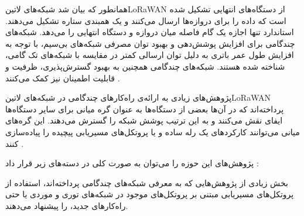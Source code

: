 
همانطور که بیان شد شبکه‌های ‌لاتین{LoRaWAN} از دستگاه‌های انتهایی تشکیل شده است که داده را برای دروازه‌ها ارسال می‌کنند و یک همبندی ستاره تشکیل می‌دهند.
استاندارد تنها اجازه یک گام فاصله میان دروازه و دستگاه انتهایی را می‌دهد.
شبکه‌های چندگامی برای افزایش پوشش‌دهی و بهبود توان مصرفی شبکه‌های بی‌سیم،
با توجه به افزایش طول عمر باتری به دلیل توان ارسالی کمتر در مقایسه با شبکه‌های تک گامی،
شناخته شده هستند.
شبکه‌های چندگامی همچنین به بهبود گسترش‌پذیری، ظرفیت و قابلیت اطمینان نیز کمک می‌کنند
.

پژوهش‌های زیادی به ارائه‌ی راه‌کارهای چندگامی در شبکه‌های ‌لاتین{LoRaWAN} پرداخته‌اند که در آن‌ها بعضی از دستگاه‌ها به عنوان گره میانی برای سایر دستگاه‌ها ایفای نقش می‌کنند و
به این ترتیب پوشش شبکه را گسترش می‌دهند. این گره‌های میانی می‌توانند کارکردهای یک رله ساده و یا پروتکل‌های مسیریابی پیچیده را پیاده‌سازی کنند
.

پژوهش‌های این حوزه را می‌توان به صورت کلی در دسته‌های زیر قرار داد :

 بخش زیادی از پژوهش‌هایی که به معرفی شبکه‌های چندگامی پرداخته‌اند، استفاده از پروتکل‌های مسیریابی مبتنی بر پروتکل‌های موجود در شبکه‌های توری و موردی یا حتی راه‌کارهای جدید، را پیشنهاد می‌دهند.
